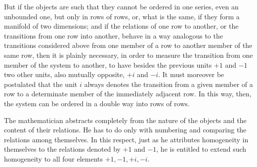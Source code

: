\documentclass[12pt]{article}
\begin{document}
But if the objects are such that they cannot be ordered in one series, even an unbounded one, but only in rows of rows, or, what is the same, if they form a manifold of two dimensions; and if the relations of one row to another, or the transitions from one row into another, behave in a way analogous to the transitions considered above from one member of a row to another member of the same row, then it is plainly necessary, in order to measure the transition from one member of the system to another, to have besides the previous units $+1$ and $-1$ two other units, also mutually opposite, $+i$ and $-i$. It must moreover be postulated that the unit $i$ always denotes the transition from a given member of a row to a determinate member of the immediately adjacent row. In this way, then, the system can be ordered in a double way into rows of rows.

The mathematician abstracts completely from the nature of the objects and the content of their relations. He has to do only with numbering and comparing the relations among themselves. In this respect, just as he attributes homogeneity in themselves to the relations denoted by $+1$ and $-1$, he is entitled to extend such homogeneity to all four elements $+1,-1,+i,-i$.
\end{document}
